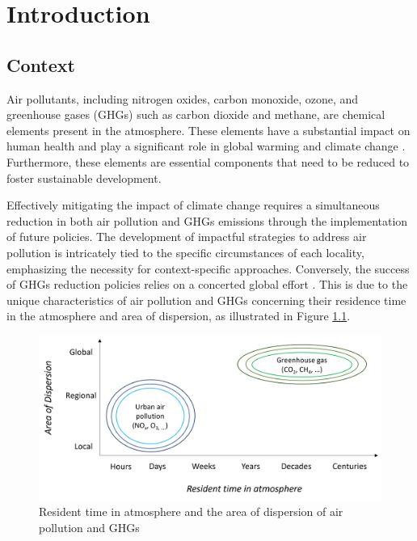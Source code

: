 \chapter{Introduction} \label{chap1}
\renewcommand{\headrulewidth}{0pt}
\lhead[\thepage]{\leftmark}
\rhead[\leftmark]{\thepage}
\cfoot[]{}

 \section{Context}

 Air pollutants, including nitrogen oxides, carbon monoxide, ozone, and greenhouse gases (GHGs) such as carbon dioxide and methane, are chemical elements present in the atmosphere. These elements have a substantial impact on human health \citep{kampa2008human} and play a significant role in global warming and climate change \citep{haines2006climate}. Furthermore, these elements are essential components that need to be reduced to foster sustainable development. \par

Effectively mitigating the impact of climate change requires a simultaneous reduction in both air pollution and GHGs emissions through the implementation of future policies. The development of impactful strategies to address air pollution is intricately tied to the specific circumstances of each locality, emphasizing the necessity for context-specific approaches. Conversely, the success of GHGs reduction policies relies on a concerted global effort \citep{keohane2011regime}. This is due to the unique characteristics of air pollution and GHGs concerning their residence time in the atmosphere and area of dispersion, as illustrated in Figure \ref{fig:chap1_fig1}.\par

\begin{figure}[tbh!]
    \centering
    \includegraphics[width=\textwidth]{figs/chap1/residenttime.png}
    \caption[Resident time in atmosphere and the area of dispersion]{Resident time in atmosphere and the area of dispersion of air pollution and GHGs}
    \label{fig:chap1_fig1}
\end{figure}

